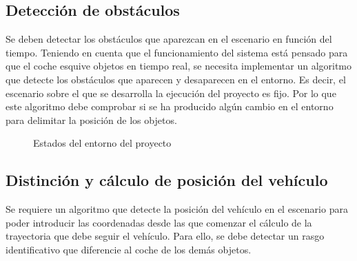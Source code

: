 \subsection{Detección de obstáculos}\label{sec:DetecciónObstáculos}

Se deben detectar los obstáculos que aparezcan en el escenario en función del tiempo. Teniendo en cuenta que el funcionamiento del sistema está pensado para que el coche esquive objetos en tiempo real, se necesita implementar un algoritmo que detecte los obstáculos que aparecen y desaparecen en el entorno. Es decir, el escenario sobre el que se desarrolla la ejecución del proyecto es fijo. Por lo que este algoritmo debe comprobar si se ha producido algún cambio en el entorno para delimitar la posición de los objetos.

\begin{figure}[htbp]
 \centering
 \caption{Estados del entorno del proyecto}
 \label{fig:EstadosLaboratorio}
\end{figure}

\subsection{Distinción y cálculo de posición del vehículo}\label{sec:DetecciónVehiculo}

Se requiere un algoritmo que detecte la posición del vehículo en el escenario para poder introducir las coordenadas desde las que comenzar el cálculo de la trayectoria que debe seguir el vehículo. Para ello, se debe detectar un rasgo identificativo que diferencie al coche de los demás objetos.

